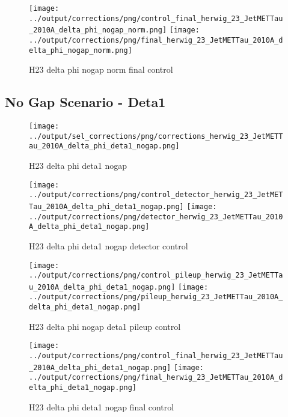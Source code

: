 \documentclass[11pt]{book}
\begin{document}
\begin{figure}[ht]
\centering
\texttt{[image: ../output/corrections/png/control\_final\_herwig\_23\_JetMETTau\_2010A\_delta\_phi\_nogap\_norm.png]}
\texttt{[image: ../output/corrections/png/final\_herwig\_23\_JetMETTau\_2010A\_delta\_phi\_nogap\_norm.png]}
\caption{H23 delta phi nogap norm final control}
\label{fig:H23_JetMETTau_2010A_delta_phi_nogap_norm_final_control}
\end{figure}




\clearpage
\subsection{No Gap Scenario - Deta1}
\begin{figure}[ht]
\centering
\texttt{[image: ../output/sel\_corrections/png/corrections\_herwig\_23\_JetMETTau\_2010A\_delta\_phi\_deta1\_nogap.png]}
\caption{H23 delta phi deta1 nogap}
\label{fig:H23_JetMETTau_2010A_delta_phi_deta1_nogap}
\end{figure}

\begin{figure}[ht]
\centering
\texttt{[image: ../output/corrections/png/control\_detector\_herwig\_23\_JetMETTau\_2010A\_delta\_phi\_deta1\_nogap.png]}
\texttt{[image: ../output/corrections/png/detector\_herwig\_23\_JetMETTau\_2010A\_delta\_phi\_deta1\_nogap.png]}
\caption{H23 delta phi deta1 nogap detector control}
\label{fig:H23_JetMETTau_2010A_delta_phi_deta1_nogap_detector_control}
\end{figure}

\begin{figure}[ht]
\centering
\texttt{[image: ../output/corrections/png/control\_pileup\_herwig\_23\_JetMETTau\_2010A\_delta\_phi\_deta1\_nogap.png]}
\texttt{[image: ../output/corrections/png/pileup\_herwig\_23\_JetMETTau\_2010A\_delta\_phi\_deta1\_nogap.png]}
\caption{H23 delta phi nogap deta1 pileup control}
\label{fig:H23_JetMETTau_2010A_delta_phi_deta1_nogap_pileup_control}
\end{figure}


\begin{figure}[ht]
\centering
\texttt{[image: ../output/corrections/png/control\_final\_herwig\_23\_JetMETTau\_2010A\_delta\_phi\_deta1\_nogap.png]}
\texttt{[image: ../output/corrections/png/final\_herwig\_23\_JetMETTau\_2010A\_delta\_phi\_deta1\_nogap.png]}
\caption{H23 delta phi deta1 nogap final control}
\label{fig:H23_JetMETTau_2010A_delta_phi_deta1_nogap_final_control}
\end{figure}
\end{document}
